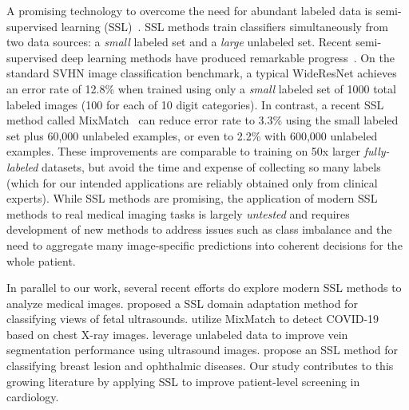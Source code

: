 A promising technology to overcome the need for abundant labeled data is semi-supervised learning (SSL)~\citep{zhuSemiSupervisedLearningLiterature2005,chapelleSemiSupervisedLearning2010,vanengelenSurveySemisupervisedLearning2020}.
SSL methods train classifiers simultaneously from two data sources: a \emph{small} labeled set and a \emph{large} unlabeled set.
Recent semi-supervised deep learning methods have produced remarkable progress~\citep{miyatoVirtualAdversarialTraining2019,berthelotRemixmatchSemisupervisedLearning2019,berthelotMixmatchHolisticApproach2019,sohnFixmatchSimplifyingSemisupervised2020,xie2019unsupervised,chenBigSelfSupervisedModels2020}.
On the standard SVHN image classification benchmark, a typical WideResNet achieves an error rate of 12.8\% when trained using only a \emph{small} labeled set of 1000 total labeled images (100 for each of 10 digit categories).
In contrast, a recent SSL method called MixMatch~\citep{berthelotMixmatchHolisticApproach2019} can reduce error rate to 3.3\% using the small labeled set plus 60,000 unlabeled examples, or even to 2.2\% with 600,000 unlabeled examples.
These improvements are comparable to training on 50x larger \emph{fully-labeled} datasets, but avoid the time and expense of collecting so many labels (which for our intended applications are reliably obtained only from clinical experts).
While SSL methods are promising, the application of modern SSL methods to real medical imaging tasks is largely \emph{untested} and requires development of new methods to address issues such as class imbalance and the need to aggregate many image-specific predictions into coherent decisions for the whole patient. 

In parallel to our work, several recent efforts do explore modern SSL methods to analyze medical images. \citet{meng2020mutual} proposed a SSL domain adaptation method for classifying views of fetal ultrasounds. \citet{calderon2021dealing} utilize MixMatch to detect COVID-19 based on chest X-ray images. \citet{chen2021venibot} leverage unlabeled data to improve vein segmentation performance using ultrasound images. \citet{wang2021deep} propose an SSL method for classifying breast lesion and ophthalmic diseases.
Our study contributes to this growing literature by applying SSL to improve patient-level screening in cardiology.

